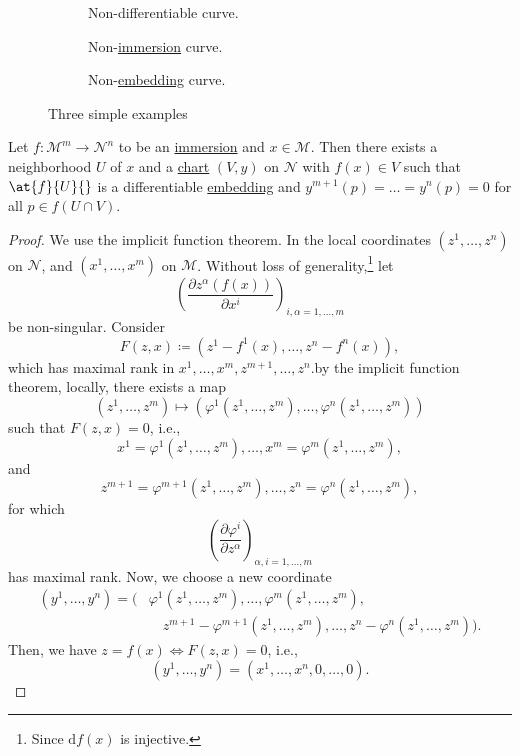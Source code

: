 \begin{figure}[H]
	\centering
	\begin{subfigure}[b]{0.3\textwidth}
		\centering
		\caption{Non-differentiable curve.}
	\end{subfigure}
	\hfill
	\begin{subfigure}[b]{0.3\textwidth}
		\centering
		\caption{Non-\hyperref[def:immersion]{immersion} curve.}
	\end{subfigure}
	\hfill
	\begin{subfigure}[b]{0.3\textwidth}
		\centering
		\caption{Non-\hyperref[def:embedding]{embedding} curve.}
	\end{subfigure}
	\caption{Three simple examples}
\end{figure}

\begin{lemma}
	Let \(f\colon \mathcal{M}^m \to \mathcal{N}^n \) to be an \hyperref[def:immersion]{immersion} and \(x\in \mathcal{M} \). Then there exists a neighborhood \(U\) of \(x\) and a \hyperref[def:coordinate-chart]{chart} \((V, y)\) on \(\mathcal{N} \) with \(f(x)\in V\) such that \(\at{f}{U}{}\) is a differentiable \hyperref[def:embedding]{embedding} and \(y^{m+1}(p) = \ldots = y^n(p) = 0\) for all \(p\in f(U \cap V)\).
\end{lemma}
\begin{proof}
	We use the implicit function theorem. In the local coordinates \((z^1, \ldots , z^n)\) on \(\mathcal{N} \), and \((x^1, \ldots , x^m)\) on \(\mathcal{M} \). Without loss of generality,\footnote{Since \(\mathrm{d} f(x)\) is injective.} let
	\[
		\left( \frac{\partial z^\alpha (f(x))}{\partial x^i} \right) _{i, \alpha = 1, \ldots , m}
	\]
	be non-singular. Consider
	\[
		F(z, x) \coloneqq \left( z^1 - f^1(x), \ldots , z^n - f^n(x) \right),
	\]
	which has maximal rank in \(x^1, \ldots , x^m, z^{m+1}, \ldots , z^n\).by the implicit function theorem, locally, there exists a map
	\[
		(z^1, \ldots , z^m) \mapsto (\varphi ^1(z^1, \ldots , z^m) , \ldots , \varphi ^n(z^1, \ldots , z^m))
	\]
	such that \(F(z, x) = 0\), i.e.,
	\[
		x^1 = \varphi ^1(z^1, \ldots , z^m), \ldots , x^m = \varphi ^m(z^1, \ldots , z^m),
	\]
	and
	\[
		z^{m+1} = \varphi ^{m+1}(z^1, \ldots , z^m), \ldots , z^n = \varphi ^n(z^1, \ldots , z^m),
	\]
	for which
	\[
		\left( \frac{\partial \varphi ^i}{\partial z^\alpha }  \right) _{\alpha , i = 1, \ldots , m}
	\]
	has maximal rank. Now, we choose a new coordinate
	\[
		\begin{split}
			(y^1, \ldots , y^n)
			= \big( &\varphi ^1(z^1, \ldots , z^m), \ldots , \varphi ^m (z^1, \ldots , z^m), \\
			&\quad z^{m+1} - \varphi ^{m+1}(z^1, \ldots , z^m), \ldots , z^n - \varphi ^n(z^1, \ldots , z^m) \big).
		\end{split}
	\]
	Then, we have \(z = f(x) \iff F(z, x) = 0\), i.e.,
	\[
		(y^1, \ldots , y^n) = (x^1, \ldots , x^n, 0, \ldots , 0).
	\]
\end{proof}

